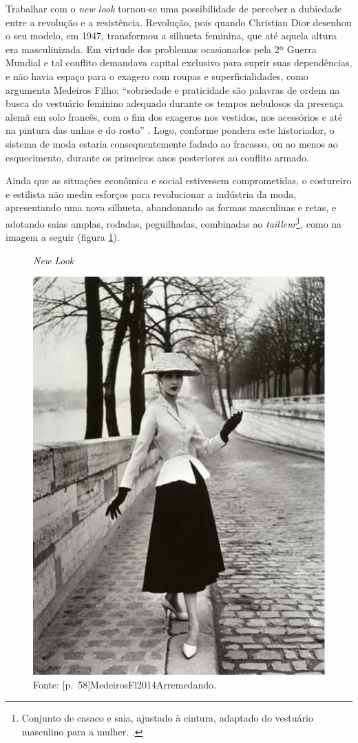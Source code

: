 \begin{refsection}
    Trabalhar com o \textit{new look} tornou-se uma possibilidade de perceber a dubiedade entre a revolução e a resistência. Revolução, pois quando Christian Dior desenhou o seu modelo, em 1947, transformou a silhueta feminina, que até aquela altura era masculinizada. Em virtude dos problemas ocasionados pela 2ª Guerra Mundial e tal conflito demandava capital exclusivo para suprir suas dependências, e não havia espaço para o exagero com roupas e superficialidades, como argumenta Medeiros Filho: ``sobriedade e praticidade são palavras de ordem na busca do vestuário feminino adequado durante os tempos nebulosos da presença alemã em solo francês, com o fim dos exageros nos vestidos, nos acessórios e até na pintura das unhas e do rosto'' \cite[p.~103]{MedeirosFl2014Arremedando}. Logo, conforme pondera este historiador, o sistema de moda estaria consequentemente fadado ao fracasso, ou ao menos ao esquecimento, durante os primeiros anos posteriores ao conflito armado.

    Ainda que as situações econômica e social estivessem comprometidas, o costureiro e estilista não mediu esforços para revolucionar a indústria da moda, apresentando uma nova silhueta, abandonando as formas masculinas e retas, e adotando saias amplas, rodadas, peguilhadas, combinadas ao \textit{tailleur}\footnote{Conjunto de casaco e saia, ajustado à cintura, adaptado do vestuário masculino para a mulher. \cite[p.~229]{MedeirosFl2014Arremedando}.}, como na imagem a seguir (figura \ref{fig:new-look}).

    \begin{figure}[ht]%
        \centering%
        \caption{\textit{New Look}}%
        \includegraphics[width=.333\textwidth]{articles/06-vencido-o-new-look-r/01-new-look.jpg}%
        \caption*{Fonte: [p.~58]{MedeirosFl2014Arremedando}.}%
        \label{fig:new-look}%
    \end{figure}%


\end{refsection}
